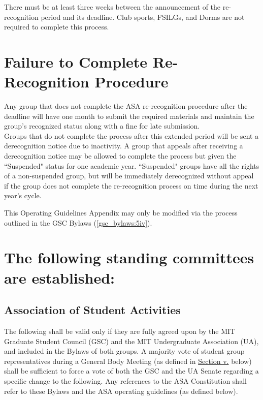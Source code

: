\documentclass[12pt]{article}
\begin{document}
There must be at least three weeks between the announcement of the re-recognition period and its
    deadline. Club sports, FSILGs, and Dorms are not required to complete this process.

\section{Failure to Complete Re-Recognition Procedure}
Any group that does not complete the ASA re-recognition procedure after the deadline will have one
    month to submit the required materials and maintain the group's recognized status along with a
    fine for late submission.
\\

Groups that do not complete the process after this extended period will be sent a derecognition notice
    due to inactivity.
A group that appeals after receiving a derecognition notice may be allowed to complete the process
    but given the ``Suspended" status for one academic year.
``Suspended" groups have all the rights of a non-suspended group, but will be immediately derecognized
    without appeal if the group does not complete the re-recognition process on time during the next year's cycle.

This Operating Guidelines Appendix may only be modified via the process outlined in the GSC Bylaws (\ref{gsc_bylaws:5iv}).

\newpage

\label{app:C}

\setcounter{article}{1}

\setcounter{section}{6}
\let\secnum\Alph

\section{The following standing committees are established:}

\setcounter{subsection}{4}
\let\subsubnum\Roman
\subsection{Association of Student Activities}
The following shall be valid only if they are fully agreed upon by the MIT Graduate Student Council (GSC)
    and the MIT Undergraduate Association (UA), and included in the Bylaws of both groups.
A majority vote of student group representatives during a General Body Meeting
    (as defined in \hyperref[gbms]{Section v.} below) shall be sufficient to force a vote of both the GSC
    and the UA Senate regarding a specific change to the following.
Any references to the ASA Constitution shall refer to these Bylaws and the ASA operating guidelines (as defined below).
\end{document}

